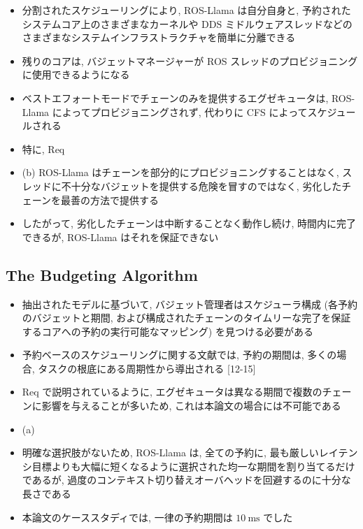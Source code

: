 \begin{frame}{}
    \begin{itemize}
        \item 分割されたスケジューリングにより, ROS-Llama は自分自身と, 予約されたシステムコア上のさまざまなカーネルや DDS ミドルウェアスレッドなどのさまざまなシステムインフラストラクチャを簡単に分離できる
\item 残りのコアは, バジェットマネージャーが ROS スレッドのプロビジョニングに使用できるようになる
    \end{itemize}
\end{frame}

\begin{frame}{}
    \begin{itemize}
        \item ベストエフォートモードでチェーンのみを提供するエグゼキュータは, ROS-Llama によってプロビジョニングされず, 代わりに CFS によってスケジュールされる
\item 特に, Req
\item (b) ROS-Llama はチェーンを部分的にプロビジョニングすることはなく, スレッドに不十分なバジェットを提供する危険を冒すのではなく, 劣化したチェーンを最善の方法で提供する
\item したがって, 劣化したチェーンは中断することなく動作し続け, 時間内に完了できるが, ROS-Llama はそれを保証できない
    \end{itemize}
\end{frame}


\subsection{The Budgeting Algorithm}
\label{ssec: the budgeting algorithm}

\begin{frame}{}
    \begin{itemize}
        \item 抽出されたモデルに基づいて, バジェット管理者はスケジューラ構成 (各予約のバジェットと期間, および構成されたチェーンのタイムリーな完了を保証するコアへの予約の実行可能なマッピング) を見つける必要がある
    \end{itemize}
\end{frame}

\begin{frame}{}
    \begin{itemize}
        \item 予約ベースのスケジューリングに関する文献では, 予約の期間は, 多くの場合, タスクの根底にある周期性から導出される [12-15]
\item Req で説明されているように, エグゼキュータは異なる期間で複数のチェーンに影響を与えることが多いため, これは本論文の場合には不可能である
\item (a)
\item 明確な選択肢がないため, ROS-Llama は, 全ての予約に, 最も厳しいレイテンシ目標よりも大幅に短くなるように選択された均一な期間を割り当てるだけであるが, 過度のコンテキスト切り替えオーバヘッドを回避するのに十分な長さである
\item 本論文のケーススタディでは, 一律の予約期間は $10 \mathrm{~ms}$ でした
    \end{itemize}
\end{frame}

